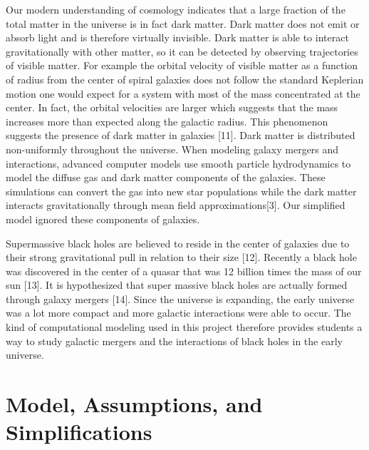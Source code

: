 \documentclass[11pt]{article}
\begin{document}
Our modern understanding of cosmology indicates that a large fraction of the total matter in the universe is in fact dark matter.  Dark matter does not emit or absorb light and is therefore virtually invisible.  Dark matter is able to interact gravitationally with other matter, so it can be detected by observing trajectories of visible matter.  For example the orbital velocity of visible matter as a function of radius from the center of spiral galaxies does not follow the standard Keplerian motion one would expect for a system with most of the mass concentrated at the center.  In fact, the orbital velocities are larger which suggests that the mass increases more than expected along the galactic radius.  This phenomenon suggests the presence of dark matter in galaxies [11]. Dark matter is distributed non-uniformly throughout the universe. When modeling galaxy mergers and interactions, advanced computer models use smooth particle hydrodynamics to model the diffuse gas and dark matter components of the galaxies.  These simulations can convert the gas into new star populations while the dark matter interacts gravitationally through mean field approximations[3].  Our simplified model ignored these components of galaxies.

Supermassive black holes are believed to reside in the center of galaxies due to their strong gravitational pull in relation to their size [12].  Recently a black hole was discovered in the center of a quasar that was 12 billion times the mass of our sun [13].  It is hypothesized that super massive black holes are actually formed through galaxy mergers [14].  Since the universe is expanding, the early universe was a lot more compact and more galactic interactions were able to occur. The kind of computational modeling used in this project therefore provides students a way to study galactic mergers and the interactions of black holes in the early universe.   

\section{Model, Assumptions, and Simplifications}\label{MAS_sec}
\end{document}
